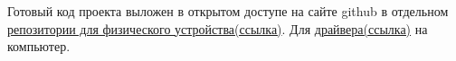 	Готовый код проекта выложен в открытом доступе на сайте github в отдельном \href{https://github.com/khosta77/stm32f4_ILI9488}{репозитории для физического устройства(ссылка)}. Для \href{https://github.com/khosta77/ft2xx_fast_start}{драйвера(ссылка)} на компьютер.


	
	
	
	
	
